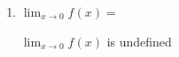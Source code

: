 \documentclass{ximera}
\begin{document}
\begin{problem}
\begin{enumerate}
\begin{enumerate}
        \item $\displaystyle \lim_{x \to 0} f(x) = $
\begin{explanation}
            $\displaystyle \lim_{x \to 0} f(x)$ is undefined
          \end{explanation}

      \end{enumerate}

  \end{enumerate}

\end{problem}
\end{document}
